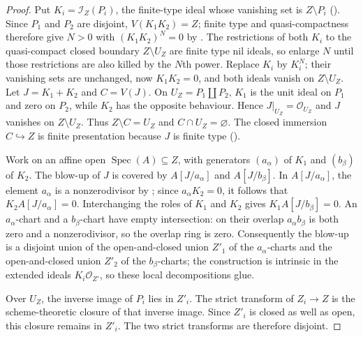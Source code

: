 \begin{proof}
  Put $K_i=\mathcal I_Z(P_i)$, the finite-type ideal whose vanishing set is
  $Z\setminus P_i$ ().  Since
  $P_1$ and $P_2$ are disjoint, $V(K_1K_2)=Z$; finite type and
  quasi-compactness therefore give $N>0$ with $(K_1K_2)^N=0$ by
  .  The restrictions of
  both $K_i$ to the quasi-compact closed boundary $Z\setminus U_Z$ are finite
  type nil ideals, so enlarge $N$ until those restrictions are also killed by
  the $N$th power.  Replace $K_i$ by $K_i^N$; their vanishing sets are
  unchanged, now $K_1K_2=0$, and both ideals vanish on $Z\setminus U_Z$.  Let
  $J=K_1+K_2$ and $C=V(J)$.  On $U_Z=P_1\amalg P_2$, $K_1$ is the unit ideal
  on $P_1$ and zero on $P_2$, while $K_2$ has the opposite behaviour.  Hence
  $J|_{U_Z}=\mathcal O_{U_Z}$ and $J$ vanishes on $Z\setminus U_Z$.  Thus
  $Z\setminus C=U_Z$ and $C\cap U_Z=\varnothing$.  The closed
  immersion $C\hookrightarrow Z$ is finite presentation because $J$ is finite
  type ().

  Work on an affine open $\operatorname{Spec}(A)\subseteq Z$, with generators
  $(a_\alpha)$ of $K_1$ and $(b_\beta)$ of $K_2$.  The blow-up of $J$ is
  covered by $A[J/a_\alpha]$ and $A[J/b_\beta]$.  In
  $A[J/a_\alpha]$, the element $a_\alpha$ is a nonzerodivisor by
  ; since
  $a_\alpha K_2=0$, it follows that $K_2A[J/a_\alpha]=0$.  Interchanging
  the roles of $K_1$ and $K_2$ gives $K_1A[J/b_\beta]=0$.  An
  $a_\alpha$-chart and a $b_\beta$-chart have empty
  intersection: on their overlap $a_\alpha b_\beta$ is both zero and a
  nonzerodivisor, so the overlap ring is zero.  Consequently the blow-up is a
  disjoint union of the open-and-closed union $Z'_1$ of the $a_\alpha$-charts
  and the open-and-closed union $Z'_2$ of the $b_\beta$-charts; the construction
  is intrinsic in the extended ideals $K_i\mathcal O_{Z'}$, so these local
  decompositions glue.

  Over $U_Z$, the inverse image of $P_i$ lies in $Z'_i$.  The strict transform
  of $Z_i\to Z$ is the scheme-theoretic closure of that inverse image.  Since
  $Z'_i$ is closed as well as open, this closure remains in $Z'_i$.  The two
  strict transforms are therefore disjoint.
\end{proof}

